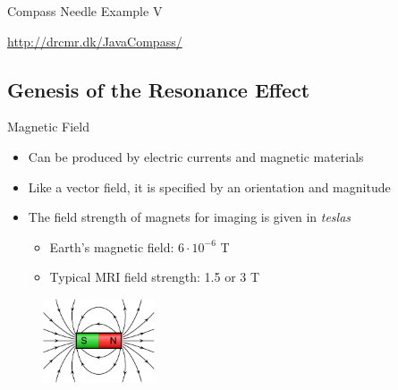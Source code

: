 \begin{frame}{Compass Needle Example V}

    \begin{center}
        \url{http://drcmr.dk/JavaCompass/}
    \end{center}
\end{frame}



\subsection{Genesis of the Resonance Effect} %
\label{sub:genesis_of_the_resonance_effect}

\begin{frame}{Magnetic Field}

    \begin{itemize}
        \item Can be produced by electric currents and magnetic materials
        \item Like a vector field, it is specified by an orientation and magnitude
        \item The field strength of magnets for imaging is given in \emph{teslas}
              \begin{itemize}
                  \item Earth's magnetic field: $6 \cdot 10^{-6}$ T
                  \item Typical MRI field strength: 1.5 or 3 T
              \end{itemize}
    \end{itemize}

    \begin{figure}
        \centering
        \includegraphics[height=2.5cm]{images/magnetic_field.pdf}
    \end{figure}

\end{frame}

